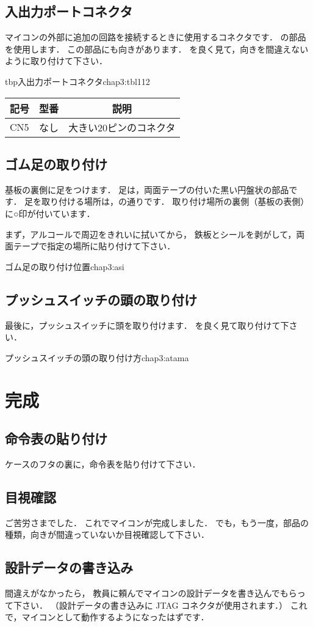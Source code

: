 
\subsection{入出力ポートコネクタ}
マイコンの外部に追加の回路を接続するときに使用するコネクタです．
の部品を使用します．
この部品にも向きがあります．
を良く見て，向きを間違えないように取り付けて下さい．

\begin{mytable}{tbp}{入出力ポートコネクタ}{chap3:tbl112}
  {\small\begin{tabular}{l|l|l}
    \hline
    \hline
    \multicolumn{1}{c|}{記号} &
    \multicolumn{1}{c|}{型番} &
    \multicolumn{1}{c}{説明} \\
    \hline
    CN5 & なし & 大きい20ピンのコネクタ \\
  \end{tabular}}
\end{mytable}


\subsection{ゴム足の取り付け}
基板の裏側に足をつけます．
足は，両面テープの付いた黒い円盤状の部品です．
足を取り付ける場所は，の通りです．
取り付け場所の裏側（基板の表側）に○印が付いています．

まず，アルコールで周辺をきれいに拭いてから，
鉄板とシールを剥がして，両面テープで指定の場所に貼り付けて下さい．

          {ゴム足の取り付け位置}{chap3:asi}

\subsection{プッシュスイッチの頭の取り付け}
最後に，プッシュスイッチに頭を取り付けます．
を良く見て取り付けて下さい．

          {プッシュスイッチの頭の取り付け方}{chap3:atama}

\section{完成}
\subsection{命令表の貼り付け}
ケースのフタの裏に，命令表を貼り付けて下さい．

\subsection{目視確認}
ご苦労さまでした．
これでマイコンが完成しました．
でも，もう一度，部品の種類，向きが間違っていないか目視確認して下さい．


\subsection{設計データの書き込み}
間違えがなかったら，
教員に頼んでマイコンの設計データを書き込んでもらって下さい．
（設計データの書き込みに JTAG コネクタが使用されます．）
これで，マイコンとして動作するようになったはずです．
